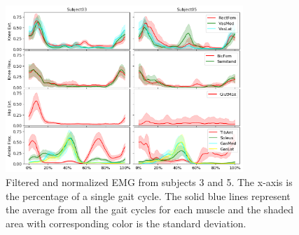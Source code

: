 \begin{figure}[ht!]
    \centering
    \includegraphics[width=0.8\textwidth]{img/results/emg_avg/subjects3and5_grid_emg_avg.png}
    \caption{Filtered and normalized \ac{EMG} from subjects 3 and 5. The x-axis is the percentage of a single gait cycle. The solid blue lines represent the average from all the gait cycles for each muscle and the shaded area with corresponding color is the standard deviation.}
    \label{fig:A-emg-average}
\end{figure}
%

\newpage
